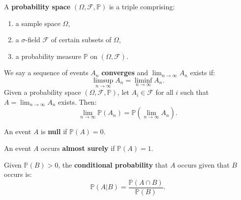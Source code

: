 \documentclass{huhtakm-template-book-v2}
\newcommand{\prob}{\mathbb{P}}
\begin{document}
    \begin{sdefn}
        A \textbf{probability space} $(\Omega, \mathcal{F}, \prob)$ is a triple comprising:
        \begin{enumerate}
            \item a sample space $\Omega$,
            \item a $\sigma$-field $\mathcal{F}$ of certain subsets of $\Omega$,
            \item a probability measure $\prob$ on $(\Omega, \mathcal{F})$.
        \end{enumerate}
    \end{sdefn}
    \begin{sdefn}
        We say a sequence of events $A_{n}$ \textbf{converges} and $\lim_{n \to \infty}A_{n}$ exists if:
        \begin{equation*}
            \limsup_{n \to \infty}A_{n} = \liminf_{n \to \infty}A_{n}.
        \end{equation*}
        Given a probability space $(\Omega, \mathcal{F}, \prob)$, let $A_{i} \in \mathcal{F}$ for all $i$ such that $A = \lim_{n \to \infty}A_{n}$ exists. Then:
        \begin{equation*}
            \lim_{n \to \infty}\prob(A_{n}) = \prob\left(\lim_{n \to \infty}A_{n}\right).
        \end{equation*}
    \end{sdefn}
    \begin{sdefn}
        An event $A$ is \textbf{null} if $\prob(A) = 0$.
    \end{sdefn}
    \begin{sdefn}
        An event $A$ occurs \textbf{almost surely} if $\prob(A) = 1$.
    \end{sdefn}
    \begin{sdefn}
        Given $\prob(B) > 0$, the \textbf{conditional probability} that $A$ occurs given that $B$ occurs is:
        \begin{equation*}
            \prob(A|B) = \frac{\prob(A \cap B)}{\prob(B)}.
        \end{equation*}
    \end{sdefn}
    \newpage
\end{document}
